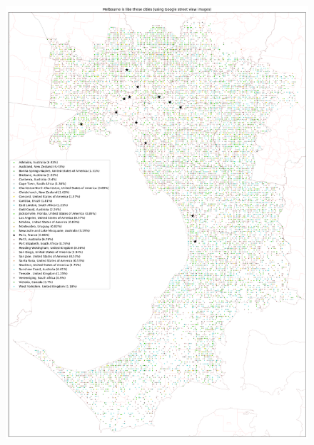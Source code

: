 \documentclass[sageh,times]{sagej}
\begin{document}
\begin{figure}[!htbp]
\centering    
\includegraphics[scale=0.15]{Images/MelbourneOverallAbrev_street.png} 

\end{figure}
\end{document}
